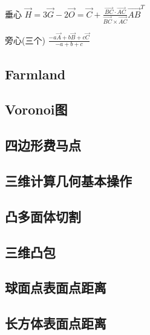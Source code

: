 \documentclass[10pt, a4paper]{article}
\begin{document}
		垂心 $\overrightarrow{H} = 3\overrightarrow{G} - 2\overrightarrow{O} = \overrightarrow{C} + \frac{\overrightarrow{BC} \cdot \overrightarrow{AC}}{\overrightarrow{BC} \times \overrightarrow{AC}} \overrightarrow{AB} ^ {T}$

		旁心(三个) $\frac{-a\overrightarrow{A} + b\overrightarrow{B} + c\overrightarrow{C}}{-a + b + c}$

	\subsection{Farmland}
		

	\subsection{Voronoi图}
		

	\subsection{四边形费马点}
		

	\subsection{三维计算几何基本操作}
		

	\subsection{凸多面体切割}
		

	\subsection{三维凸包}
		

	\subsection{球面点表面点距离}
		
		
	\subsection{长方体表面点距离}
		
\end{document}
